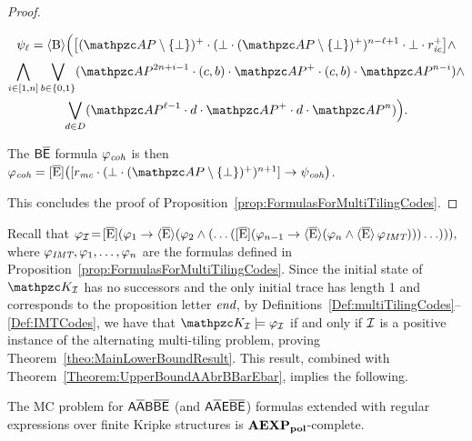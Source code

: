\begin{proof}
\begin{itemize}
\begin{multline*}
\psi_\ell =   \hsB\Bigl(\bigl[(\Prop\setminus \{\bot\})^{+}\cdot (\bot \cdot (\Prop\setminus \{\bot\})^{+})^{n-\ell+1}\cdot \bot \cdot r_\IC^{+}  \bigr] \wedge
\\
\bigwedge_{i\in [1,n]}\bigvee_{b\in \{0,1\}}(\Prop^{2n+i-1}\cdot (c,b) \cdot \Prop^{+}\cdot (c,b)\cdot \Prop^{n-i})\wedge
\\
 \bigvee_{d\in D}(\Prop^{\ell-1}\cdot d \cdot \Prop^{+}\cdot d\cdot \Prop^{n})\Bigr).
\end{multline*}
\end{itemize}
The  $\mathsf{B\overline{E}}$ formula $\varphi_{\textit{coh}}$ is then 
$\varphi_\Coh = \hsEtu\bigl([r_\MC\cdot (\bot \cdot (\Prop\setminus \{\bot\})^{+})^{n+1}  ]  \rightarrow \psi_\Coh\bigr)$.

This concludes the proof of Proposition~\ref{prop:FormulasForMultiTilingCodes}.
\end{proof}

Recall that
$\varphi_{\mathcal{I}}\!=\! \operatorname{\mathopen[ \overline{E} \mathclose]}(\varphi_1 \rightarrow \operatorname{\langle \overline{E}\rangle}(\varphi_2\wedge(\ldots (\operatorname{\mathopen[ \overline{E} \mathclose]}(\varphi_{n-1} \rightarrow \operatorname{\langle \overline{E}\rangle}(\varphi_n\wedge \operatorname{\langle \overline{E}\rangle} \varphi_{\textit{IMT}})))\ldots))),$
where $\varphi_{\textit{IMT}},\varphi_1,\ldots,\varphi_n$ are the formulas defined in Proposition~\ref{prop:FormulasForMultiTilingCodes}.
Since the initial state of $\Ku_\Instance$ has no successors and the only initial trace has length 1 and corresponds to the proposition letter $\textit{end}$, by Definitions~\ref{Def:multiTilingCodes}--\ref{Def:IMTCodes}, we have that
$\Ku_\Instance\models \varphi_\Instance$ if and only if $\mathcal{I}$ is a positive instance of the alternating multi-tiling problem, proving  Theorem~\ref{theo:MainLowerBoundResult}. This result, combined with Theorem~\ref{Theorem:UpperBoundAAbrBBarEbar}, implies the following.

\begin{corollary}
The MC problem for $\mathsf{A\overline{A}B\overline{B}\overline{E}}$ (and $\mathsf{A\overline{A}E\overline{B}\overline{E}}$) formulas extended with regular expressions over finite Kripke structures is \mbox{$\mathbf{AEXP_{pol}}$-complete}.
\end{corollary}